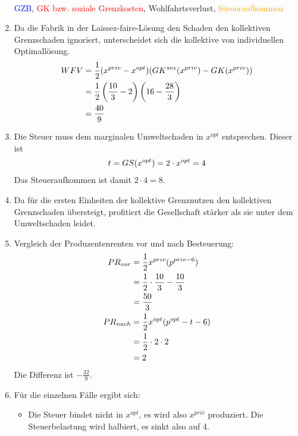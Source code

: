 \documentclass{article}
\begin{document}
\begin{enumerate}[label=(\alph*)]
\begin{center}
 \\
			\textcolor{blue}{GZB}, \textcolor{red}{GK bzw. soziale Grenzkosten}, \textcolor{green!80!black}{Wohlfahrtsverlust}, \textcolor{orange}{Steueraufkommen}
		\end{center}
		\item Da die Fabrik in der Laissez-faire-Lösung den Schaden den kollektiven Grenzschaden ignoriert, unterscheidet sich die kollektive von individuellen Optimallösung.
		\begin{align}
			WFV &= \frac{1}{2}(x^{priv}-x^{opt})(GK^{soz}(x^{priv}) - GK(x^{priv})) \notag \\
			&= \frac{1}{2}\left(\frac{10}{3}-2\right)\left(16-\frac{28}{3}\right) \notag \\
			&= \frac{40}{9} \notag
		\end{align}
		\item Die Steuer muss dem marginalen Umweltschaden in $x^{opt}$ entsprechen. Dieser ist
		\begin{align}
			t = GS(x^{opt}) = 2\cdot x^{opt} = 4 \notag
		\end{align}
		Das Steueraufkommen ist damit $2\cdot 4=8$.
		\item Da für die ersten Einheiten der kollektive Grenznutzen den kollektiven Grenzschaden übersteigt, profitiert die Gesellschaft stärker als sie unter dem Umweltschaden leidet.
		\item Vergleich der Produzentenrenten vor und nach Besteuerung:
		\begin{align}
			PR_{vor} &= \frac{1}{2}x^{priv}(p^{priv-6}) \notag \\
			&= \frac{1}{2}\cdot\frac{10}{3} - \frac{10}{3} \notag \\
			&= \frac{50}{3} \notag \\
			PR_{nach} &= \frac{1}{2}x^{opt}(p^{opt}-t-6) \notag \\
			&= \frac{1}{2}\cdot 2\cdot 2 \notag \\
			&= 2 \notag
		\end{align}
		Die Differenz ist $-\frac{32}{9}$.
		\item Für die einzelnen Fälle ergibt sich:
		\begin{itemize}
			\item Die Steuer bindet nicht in $x^{opt}$, es wird also $x^{priv}$ produziert. Die Steuerbelastung wird halbiert, es sinkt also auf 4.

\end{itemize}
\end{enumerate}
\end{document}
